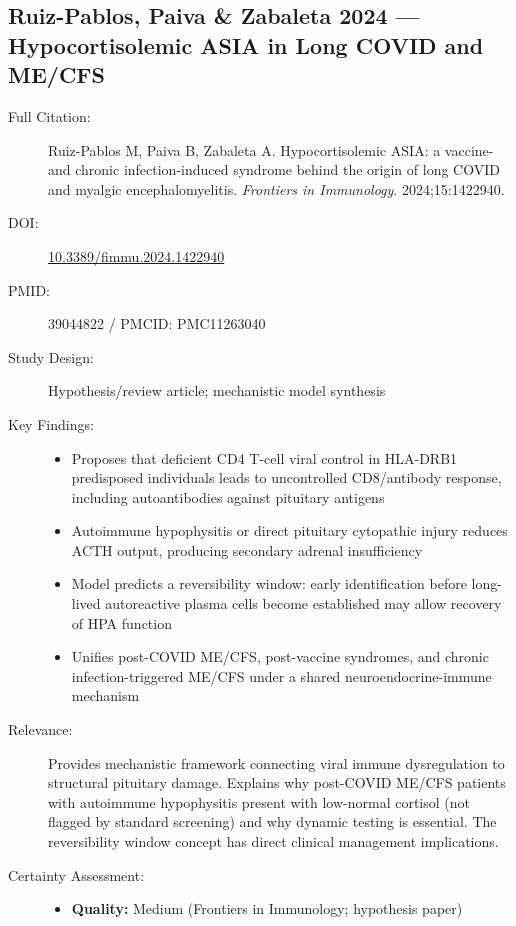 \subsection{Ruiz-Pablos, Paiva \& Zabaleta 2024 --- Hypocortisolemic ASIA in Long COVID and ME/CFS}

\begin{description}
    \item[Full Citation:] Ruiz-Pablos M, Paiva B, Zabaleta A. Hypocortisolemic ASIA: a vaccine- and chronic infection-induced syndrome behind the origin of long COVID and myalgic encephalomyelitis. \textit{Frontiers in Immunology}. 2024;15:1422940. \cite{Ruiz2024hpa}
    \item[DOI:] \href{https://doi.org/10.3389/fimmu.2024.1422940}{10.3389/fimmu.2024.1422940}
    \item[PMID:] 39044822 / PMCID: PMC11263040
    \item[Study Design:] Hypothesis/review article; mechanistic model synthesis
    \item[Key Findings:]
    \begin{itemize}
        \item Proposes that deficient CD4 T-cell viral control in HLA-DRB1 predisposed individuals leads to uncontrolled CD8/antibody response, including autoantibodies against pituitary antigens
        \item Autoimmune hypophysitis or direct pituitary cytopathic injury reduces ACTH output, producing secondary adrenal insufficiency
        \item Model predicts a reversibility window: early identification before long-lived autoreactive plasma cells become established may allow recovery of HPA function
        \item Unifies post-COVID ME/CFS, post-vaccine syndromes, and chronic infection-triggered ME/CFS under a shared neuroendocrine-immune mechanism
    \end{itemize}
    \item[Relevance:] Provides mechanistic framework connecting viral immune dysregulation to structural pituitary damage. Explains why post-COVID ME/CFS patients with autoimmune hypophysitis present with low-normal cortisol (not flagged by standard screening) and why dynamic testing is essential. The reversibility window concept has direct clinical management implications.
    \item[Certainty Assessment:]
    \begin{itemize}
        \item \textbf{Quality:} Medium (Frontiers in Immunology; hypothesis paper)

\end{itemize}
\end{description}
